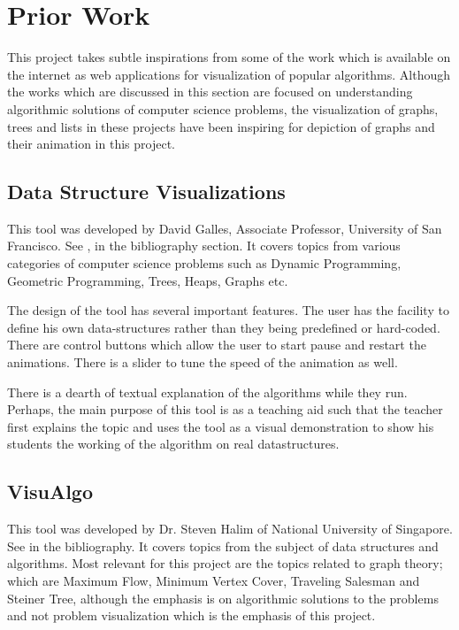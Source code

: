 \section{Prior Work}
This project takes subtle inspirations from some of the work which is available
on the internet as web applications for visualization of popular algorithms.
Although the works which are discussed in this section are focused on
understanding algorithmic solutions of computer science problems, the
visualization of graphs, trees and lists in these projects have been inspiring
for depiction of graphs and their animation in this project.

\subsection{Data Structure Visualizations}
\label{priorWork: datastrucvisu}
This tool was developed by David Galles, Associate Professor, University of San
Francisco. See \cite{Galles}, in the bibliography section.  It covers topics
from various categories of computer science problems such as Dynamic
Programming, Geometric Programming, Trees, Heaps, Graphs etc.

The design of the tool has several important features. The user has the
facility to define his own data-structures rather than they being predefined or
hard-coded. There are control buttons which allow the user to start pause and
restart the animations. There is a slider to tune the speed of the animation as
well.

There is a dearth of textual explanation of the algorithms while they run.
Perhaps, the main purpose of this tool is as a teaching aid such that the
teacher first explains the topic and uses the tool as a visual demonstration to
show his students the working of the algorithm on real datastructures.

\subsection{VisuAlgo}
\label{priorWork: visualgo}
This tool was developed by Dr. Steven Halim of National University of
Singapore. See \cite{HalimVisu} in the bibliography. It covers topics from the
subject of data structures and algorithms. Most relevant for this project are
the topics related to graph theory; which are Maximum Flow, Minimum Vertex
Cover, Traveling Salesman and Steiner Tree, although the emphasis is on
algorithmic solutions to the problems and not problem visualization which is
the emphasis of this project.

